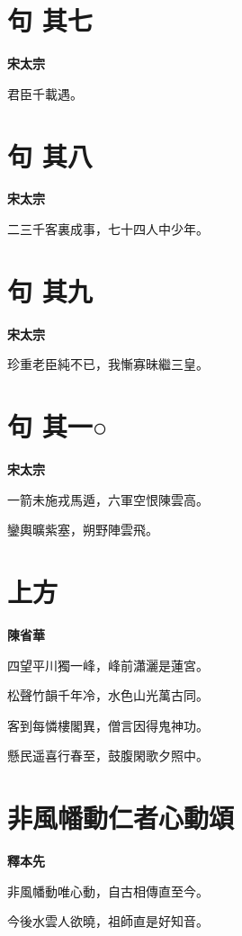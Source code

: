 \documentclass[12pt,a4paper]{ctexbook}
\begin{document}
\section{句  其七}
\textbf{宋太宗}\par\vspace{0.5em}
君臣千載遇。\par

\section{句  其八}
\textbf{宋太宗}\par\vspace{0.5em}
二三千客裏成事，七十四人中少年。\par

\section{句  其九}
\textbf{宋太宗}\par\vspace{0.5em}
珍重老臣純不已，我慚寡昧繼三皇。\par

\section{句  其一○}
\textbf{宋太宗}\par\vspace{0.5em}
一箭未施戎馬遁，六軍空恨陳雲高。\par
鑾輿曠紫塞，朔野陣雲飛。\par

\section{上方}
\textbf{陳省華}\par\vspace{0.5em}
四望平川獨一峰，峰前瀟灑是蓮宮。\par
松聲竹韻千年冷，水色山光萬古同。\par
客到每憐樓閣異，僧言因得鬼神功。\par
懸民遥喜行春至，鼓腹閑歌夕照中。\par

\section{非風幡動仁者心動頌}
\textbf{釋本先}\par\vspace{0.5em}
非風幡動唯心動，自古相傳直至今。\par
今後水雲人欲曉，祖師直是好知音。\par
\end{document}
